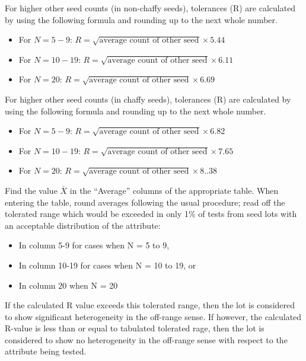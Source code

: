 \documentclass[]{book}
\providecommand{\tightlist}{%
  \setlength{\itemsep}{0pt}\setlength{\parskip}{0pt}}
\begin{document}
For higher other seed counts (in non-chaffy seeds), tolerances (R) are
calculated by using the following formula and rounding up to the next
whole number.

\begin{itemize}
\tightlist
\item
  For \(N = 5-9\):
  \(R = \sqrt{\textrm{average count of other seed}} \times 5.44\)
\item
  For \(N = 10-19\):
  \(R = \sqrt{\textrm{average count of other seed}} \times 6.11\)
\item
  For \(N = 20\):
  \(R = \sqrt{\textrm{average count of other seed}} \times 6.69\)
\end{itemize}

For higher other seed counts (in chaffy seeds), tolerances (R) are
calculated by using the following formula and rounding up to the next
whole number.

\begin{itemize}
\tightlist
\item
  For \(N = 5-9\):
  \(R = \sqrt{\textrm{average count of other seed}} \times 6.82\)
\item
  For \(N = 10-19\):
  \(R = \sqrt{\textrm{average count of other seed}} \times 7.65\)
\item
  For \(N = 20\):
  \(R = \sqrt{\textrm{average count of other seed}} \times 8..38\)
\end{itemize}

Find the value \(\bar{X}\) in the ``Average'' columns of the appropriate
table. When entering the table, round averages following the usual
procedure; read off the tolerated range which would be exceeded in only
1\% of tests from seed lots with an acceptable distribution of the
attribute:

\begin{itemize}
\tightlist
\item
  In column 5-9 for cases when N = 5 to 9,
\item
  In column 10-19 for cases when N = 10 to 19, or
\item
  In column 20 when N = 20
\end{itemize}

If the calculated R value exceeds this tolerated range, then the lot is
considered to show significant heterogeneity in the off-range sense. If
however, the calculated R-value is less than or equal to tabulated
tolerated rage, then the lot is considered to show no heterogeneity in
the off-range sense with respect to the attribute being tested.
\end{document}
